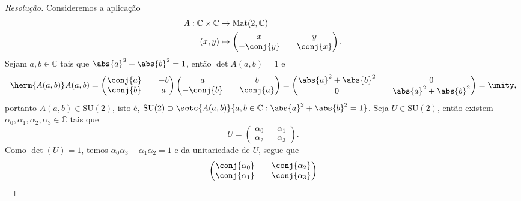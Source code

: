 \begin{proof}[Resolução]
    Consideremos a aplicação
    \begin{align*}
        A : \mathbb{C} \times \mathbb{C} &\to \mathrm{Mat}(2, \mathbb{C})\\
                                   (x,y) &\mapsto
        \begin{pmatrix}
            x && y\\
            -\conj{y} && \conj{x}
        \end{pmatrix}.
    \end{align*}
    Sejam \(a, b \in \mathbb{C}\) tais que \(\abs{a}^2 + \abs{b}^2 = 1\), então \(\det{A(a,b)} = 1\) e
    \begin{equation*}
        \herm{A(a,b)}A(a,b) = \begin{pmatrix}
            \conj{a} && -b\\
            \conj{b} && a
        \end{pmatrix}
        \begin{pmatrix}
            a && b\\
            -\conj{b}&&\conj{a}
        \end{pmatrix} =
        \begin{pmatrix}
            \abs{a}^2 + \abs{b}^2 && 0\\
            0 && \abs{a}^2 + \abs{b}^2
        \end{pmatrix}
         = \unity,
    \end{equation*}
    portanto \(A(a,b) \in \mathrm{SU}(2)\), isto é, \(\mathrm{SU}(2) \supset \setc{A(a,b)}{a,b\in \mathbb{C} : \abs{a}^2 + \abs{b}^2 = 1}\). Seja \(U \in \mathrm{SU}(2)\), então existem \(\alpha_{0}, \alpha_{1}, \alpha_{2}, \alpha_{3} \in \mathbb{C}\) tais que
    \begin{equation*}
        U = \begin{pmatrix}
            \alpha_0 && \alpha_1\\
            \alpha_2 && \alpha_3
        \end{pmatrix}.
    \end{equation*}
    Como \(\det(U) = 1\), temos \(\alpha_0 \alpha_3 - \alpha_1 \alpha_2 = 1\) e da unitariedade de \(U\), segue que
    \begin{equation*}
        \begin{pmatrix}
            \conj{\alpha_0} && \conj{\alpha_2}\\
            \conj{\alpha_1} && \conj{\alpha_3}
        \end{pmatrix}

\end{equation*}
\end{proof}
